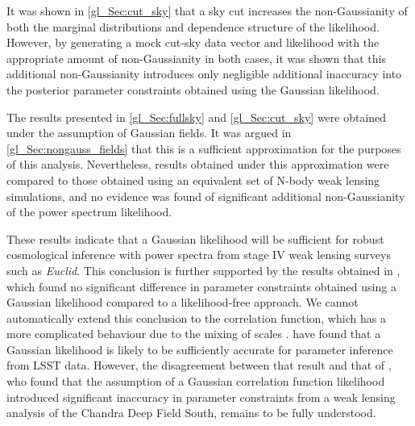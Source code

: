 It was shown in \autoref{gl_Sec:cut_sky} that a sky cut increases the non-Gaussianity of both the marginal distributions and dependence structure of the likelihood. However, by generating a mock cut-sky data vector and likelihood with the appropriate amount of non-Gaussianity in both cases, it was shown that this additional non-Gaussianity introduces only negligible additional inaccuracy into the posterior parameter constraints obtained using the Gaussian likelihood.

The results presented in \autoref{gl_Sec:fullsky} and \autoref{gl_Sec:cut_sky} were obtained under the assumption of Gaussian fields. It was argued in \autoref{gl_Sec:nongauss_fields} that this is a sufficient approximation for the purposes of this analysis. Nevertheless, results obtained under this approximation were compared to those obtained using an equivalent set of N-body weak lensing simulations, and no evidence was found of significant additional non-Gaussianity of the power spectrum likelihood.

These results indicate that a Gaussian likelihood will be sufficient for robust cosmological inference with power spectra from stage IV weak lensing surveys such as \textit{Euclid}. This conclusion is further supported by the results obtained in \citet{Taylor2019}, which found no significant difference in parameter constraints obtained using a Gaussian likelihood compared to a likelihood-free approach. We cannot automatically extend this conclusion to the correlation function, which has a more complicated behaviour due to the mixing of scales \citep{Sellentin2018}. \citet{Lin2020} have found that a Gaussian likelihood is likely to be sufficiently accurate for parameter inference from LSST data. However, the disagreement between that result and that of \citet{Hartlap2009}, who found that the assumption of a Gaussian correlation function likelihood introduced significant inaccuracy in parameter constraints from a weak lensing analysis of the Chandra Deep Field South, remains to be fully understood.



% 

